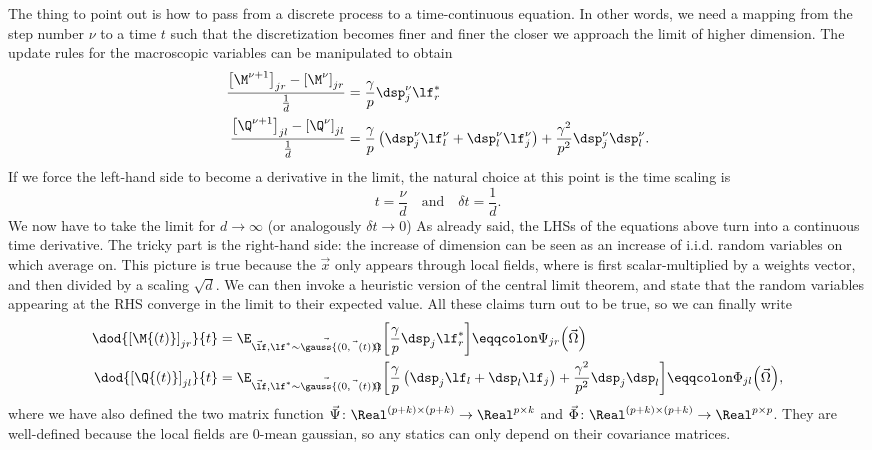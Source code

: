The thing to point out is how to pass from a discrete process to a time-continuous equation.
In other words, we need a mapping from the step number \(\nu\) to a time \(t\) such that
the discretization becomes finer and finer the closer we approach the limit of higher dimension.
The update rules for the macroscopic variables can be manipulated to obtain
\begin{subequations}\label{eq:order_param_discrete_derivative}\begin{align}
  \frac{\left[\M^{\nu+1}\right]_{jr} - \left[\M^{\nu}\right]_{jr}}{\frac1d} &= \frac{\gamma}{p} \dsp^\nu_j \lf_r^*\\
  \frac{\left[\Q^{\nu+1}\right]_{jl} - \left[\Q^{\nu}\right]_{jl}}{\frac1d} &=
    \frac{\gamma}{p}\left(\dsp^\nu_j \lf_l^\nu + \dsp^\nu_l \lf_j^\nu\right) + \frac{\gamma^2}{p^2} \dsp^\nu_j\dsp^\nu_l.
\end{align}\end{subequations}
If we force the left-hand side to become a derivative in the limit, the natural choice at this point is the time scaling is
\[t=\frac{\nu}{d} \quad\text{and}\quad \delta{t} =\frac1d.\]
We now have to take the limit for \(d\to\infty\) (or analogously \(\delta t \to 0\))
As already said, the LHSs of the equations above turn into a continuous time derivative.
The tricky part is the right-hand side: the increase of dimension can be seen as 
an increase of i.i.d. random variables on which average on. This picture is true
because the \(\vec{x}\) only appears through local fields, where is first scalar-multiplied
by a weights vector, and then divided by a scaling \(\sqrt{d}\). 
We can then invoke a heuristic version of the central limit theorem,
and state that the random variables appearing at the RHS converge in the limit
to their expected value. All these claims turn out to be true, so we can finally write
\begin{subequations}\label{eq:genericODE}\begin{align}
  \label{eq:genericODEforM}
  \dod{\left[\M{\left(t\right)}\right]_{jr}}{t} &=\E_{\vec{\lf},\vec{\lf^* \sim \gauss{(0,\vec{\Omega}{(t)})}}}{\left[\frac{\gamma}{p} \dsp_j \lf_r^*\right]} \eqqcolon \Psi_{jr}{\left(\vec{\Omega}\right)}\\
  \label{eq:genericODEforQ}
  \dod{\left[\Q{\left(t\right)}\right]_{jl}}{t} &=\E_{\vec{\lf},\vec{\lf^* \sim \gauss{(0,\vec{\Omega}{(t)})}}}{\left[\frac{\gamma}{p}\left(\dsp_j \lf_l + \dsp_l \lf_j\right) + \frac{\gamma^2}{p^2} \dsp_j\dsp_l\right]} \eqqcolon \Phi_{jl}{\left(\vec{\Omega}\right)},
\end{align}\end{subequations}
where we have also defined the two matrix function \(\vec{\Psi}\colon\Real^{(p+k)\times(p+k)} \to\Real^{p\times k}\) and 
\(\vec{\Phi}\colon\Real^{(p+k)\times(p+k)} \to\Real^{p\times p}\).
They are well-defined because the local fields are 0-mean gaussian, so any statics
can only depend on their covariance matrices.

